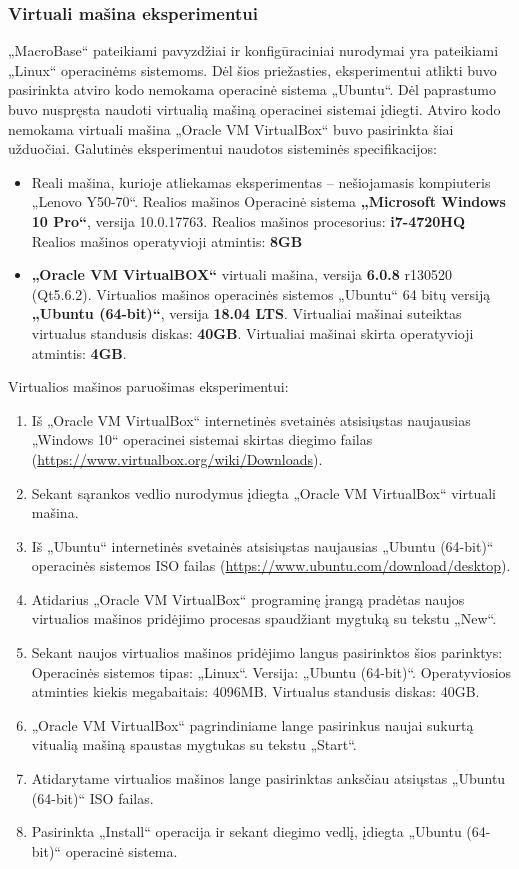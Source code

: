 \documentclass{VUMIFPSbakalaurinis}
\begin{document}
\subsubsection{Virtuali mašina eksperimentui}
„MacroBase“ pateikiami pavyzdžiai ir konfigūraciniai nurodymai yra pateikiami „Linux“ operacinėms sistemoms. Dėl šios priežasties, eksperimentui atlikti buvo pasirinkta atviro kodo nemokama operacinė sistema „Ubuntu“. Dėl paprastumo buvo nuspręsta naudoti virtualią mašiną operacinei sistemai įdiegti. Atviro kodo nemokama virtuali mašina „Oracle VM VirtualBox“ buvo pasirinkta šiai užduočiai. Galutinės eksperimentui naudotos sisteminės specifikacijos:
\begin{itemize}
	\item Reali mašina, kurioje atliekamas eksperimentas – nešiojamasis kompiuteris „Lenovo Y50-70“.
		\subitem Realios mašinos Operacinė sistema \textbf{„Microsoft Windows 10 Pro“}, versija	10.0.17763.
		\subitem Realios mašinos procesorius: \textbf{i7-4720HQ}
		\subitem Realios mašinos operatyvioji atmintis: \textbf{8GB}
	\item \textbf{„Oracle VM VirtualBOX“} virtuali mašina, versija  \textbf{6.0.8} r130520 (Qt5.6.2).
		\subitem Virtualios mašinos operacinės sistemos „Ubuntu“ 64 bitų versiją \textbf{„Ubuntu (64-bit)“}, versija \textbf{18.04 LTS}.
		\subitem Virtualiai mašinai suteiktas virtualus standusis diskas: \textbf{40GB}.
		\subitem Virtualiai mašinai skirta operatyvioji atmintis: \textbf{4GB}.
\end{itemize}

Virtualios mašinos paruošimas eksperimentui:
\begin{enumerate}
	\item Iš „Oracle VM VirtualBox“ internetinės svetainės atsisiųstas naujausias „Windows 10“ operacinei sistemai skirtas diegimo failas (\url{https://www.virtualbox.org/wiki/Downloads}).
	\item Sekant sąrankos vedlio nurodymus įdiegta „Oracle VM VirtualBox“ virtuali mašina.
	\item Iš „Ubuntu“ internetinės svetainės atsisiųstas naujausias „Ubuntu (64-bit)“ operacinės sistemos ISO failas (\url{https://www.ubuntu.com/download/desktop}).
	\item Atidarius „Oracle VM VirtualBox“ programinę įrangą pradėtas naujos virtualios mašinos pridėjimo procesas spaudžiant mygtuką su tekstu „New“.
	\item Sekant naujos virtualios mašinos pridėjimo langus pasirinktos šios parinktys:
		\subitem Operacinės sistemos tipas: „Linux“.
		\subitem Versija: „Ubuntu (64-bit)“.
		\subitem Operatyviosios atminties kiekis megabaitais: 4096MB.
		\subitem Virtualus standusis diskas: 40GB.
	\item „Oracle VM VirtualBox“ pagrindiniame lange pasirinkus naujai sukurtą vitualią mašiną spaustas mygtukas su tekstu „Start“.
	\item Atidarytame virtualios mašinos lange pasirinktas anksčiau atsiųstas „Ubuntu (64-bit)“ ISO failas.
	\item Pasirinkta „Install“ operacija ir sekant diegimo vedlį, įdiegta „Ubuntu (64-bit)“ operacinė sistema.	
\end{enumerate}
\end{document}
